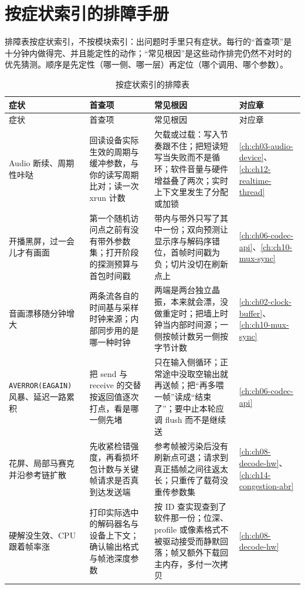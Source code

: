 \documentclass[12pt,a4paper,fontset=fandol]{ctexbook}
\newcommand{\Tp}[1]{\texttt{#1}}
\newcommand{\Bk}{\discretionary{}{}{}}
\newcommand{\Lang}[1]{\textsf{#1}}
\newcommand{\DomAud}{\Lang{Audio}}
\begin{document}
\section{按症状索引的排障手册}

排障表按症状索引，不按模块索引：出问题时手里只有症状。每行的``首查项''是
十分钟内做得完、并且能定性的动作；``常见根因''是这些动作排完仍然不对时的
优先猜测。顺序是先定性（哪一侧、哪一层）再定位（哪个调用、哪个参数）。

\small
\begin{longtable}{>{\raggedright\arraybackslash}p{}
                  >{\raggedright\arraybackslash}p{}
                  >{\raggedright\arraybackslash}p{}
                  >{\raggedright\arraybackslash}p{}}
\caption{按症状索引的排障表}\label{tab:apC-symptom} \\
\toprule
症状 & 首查项 & 常见根因 & 对应章 \\
\midrule
\endfirsthead
\toprule
症状 & 首查项 & 常见根因 & 对应章 \\
\midrule
\endhead
\midrule
\endfoot
\bottomrule
\endlastfoot
\DomAud{} 断续、周期性咔哒 & 回读设备实际生效的周期与缓冲参数，与你的读写周期比对；读一次 xrun 计数 & 欠载或过载：写入节奏跟不住；把短读短写当失败而不是循环；软件音量与硬件增益叠了两次；实时上下文里发生了分配或加锁 & \ref{ch:ch03-audio-device}、\ref{ch:ch12-realtime-thread} \\
开播黑屏，过一会儿才有画面 & 第一个随机访问点之前有没有带外参数集；打开阶段的探测预算与首包时间戳 & 带内与带外只写了其中一份；双向预测让显示序与解码序错位，首帧时间戳为负；切片没切在刷新点上 & \ref{ch:ch06-codec-api}、\ref{ch:ch10-mux-sync} \\
音画漂移随分钟增大 & 两条流各自的时间基与采样时钟来源；内部同步用的是哪一种时钟 & 两端是两台独立晶振，本来就会漂，没做重定时；把墙上时钟当内部时间源；一侧按帧计数另一侧按字节计数 & \ref{ch:ch02-clock-buffer}、\ref{ch:ch10-mux-sync} \\
\Tp{AVERROR\Bk(EAGAIN)} 风暴、延迟一路累积 & 把 send 与 receive 的交替按返回值逐次打点，看是哪一侧先堵 & 只在输入侧循环；正常途中没取空输出就再送帧；把``再多喂一帧''读成``结束了''；要中止本轮应调 flush 而不是继续送 & \ref{ch:ch06-codec-api} \\
花屏、局部马赛克并沿参考链扩散 & 先收紧检错强度，再看损坏包计数与关键帧请求是否真到达发送端 & 参考帧被污染后没有刷新点可退；请求到真正插帧之间往返太长；只重传了载荷没重传参数集 & \ref{ch:ch08-decode-hw}、\ref{ch:ch14-congestion-abr} \\
硬解没生效、CPU 跟着帧率涨 & 打印实际选中的解码器名与设备上下文；确认输出格式与帧池深度参数 & 按 ID 查实现查到了软件那一份；位深、profile 或像素格式不被驱动接受而静默回落；帧又额外下载回主内存，多付一次拷贝 & \ref{ch:ch08-decode-hw} \\

\end{longtable}
\end{document}
